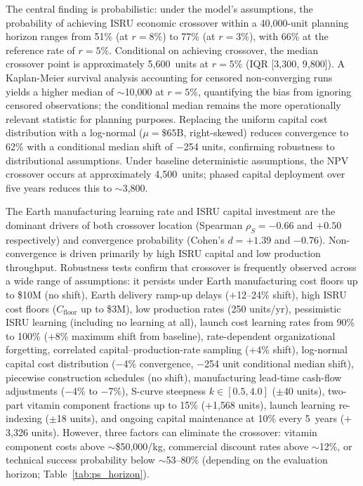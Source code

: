 \documentclass[preprint,12pt]{elsarticle}
\begin{document}
The central finding is probabilistic: under the model's assumptions, the probability of achieving ISRU economic crossover within a 40{,}000-unit planning horizon ranges from 51\% (at $r = 8\%$) to 77\% (at $r = 3\%$), with 66\% at the reference rate of $r = 5\%$. Conditional on achieving crossover, the median crossover point is approximately 5{,}600~units at $r = 5\%$ (IQR [3{,}300, 9{,}800]). A Kaplan-Meier survival analysis accounting for censored non-converging runs yields a higher median of $\sim$10{,}000 at $r = 5\%$, quantifying the bias from ignoring censored observations; the conditional median remains the more operationally relevant statistic for planning purposes. Replacing the uniform capital cost distribution with a log-normal ($\mu = \$65$B, right-skewed) reduces convergence to 62\% with a conditional median shift of $-$254 units, confirming robustness to distributional assumptions. Under baseline deterministic assumptions, the NPV crossover occurs at approximately 4{,}500~units; phased capital deployment over five years reduces this to $\sim$3{,}800.

The Earth manufacturing learning rate and ISRU capital investment are the dominant drivers of both crossover location (Spearman $\rho_S = -0.66$ and $+0.50$ respectively) and convergence probability (Cohen's $d = +1.39$ and $-0.76$). Non-convergence is driven primarily by high ISRU capital and low production throughput. Robustness tests confirm that crossover is frequently observed across a wide range of assumptions: it persists under Earth manufacturing cost floors up to \$10M (no shift), Earth delivery ramp-up delays ($+$12--24\% shift), high ISRU cost floors ($C_{\mathrm{floor}}$ up to \$3M), low production rates (250 units/yr), pessimistic ISRU learning (including no learning at all), launch cost learning rates from 90\% to 100\% ($+$8\% maximum shift from baseline), rate-dependent organizational forgetting, correlated capital--production-rate sampling ($+$4\% shift), log-normal capital cost distribution ($-$4\% convergence, $-$254 unit conditional median shift), piecewise construction schedules (no shift), manufacturing lead-time cash-flow adjustments ($-$4\% to $-$7\%), S-curve steepness $k \in [0.5, 4.0]$ ($\pm$40 units), two-part vitamin component fractions up to 15\% ($+$1{,}568 units), launch learning re-indexing ($\pm$18 units), and ongoing capital maintenance at 10\% every 5~years ($+$3{,}326 units). However, three factors can eliminate the crossover: vitamin component costs above $\sim$\$50{,}000/kg, commercial discount rates above $\sim$12\%, or technical success probability below $\sim$53--80\% (depending on the evaluation horizon; Table~\ref{tab:ps_horizon}).
\end{document}

